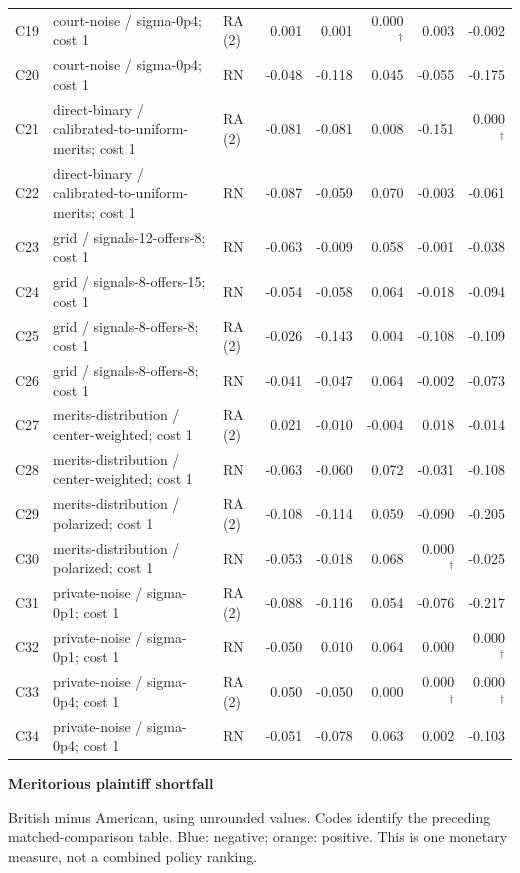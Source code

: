 \documentclass[10pt]{article}
\begin{document}
\begin{longtable}{@{}lp{3.0in}lrrrrr@{}}
C19 & court-noise / sigma-0p4; cost 1 & RA (2) & 0.001 & 0.001 & 0.000$^{\dagger}$ & 0.003 & -0.002\\
C20 & court-noise / sigma-0p4; cost 1 & RN & -0.048 & -0.118 & 0.045 & -0.055 & -0.175\\
C21 & direct-binary / calibrated-to-uniform-merits; cost 1 & RA (2) & -0.081 & -0.081 & 0.008 & -0.151 & 0.000$^{\dagger}$\\
C22 & direct-binary / calibrated-to-uniform-merits; cost 1 & RN & -0.087 & -0.059 & 0.070 & -0.003 & -0.061\\
C23 & grid / signals-12-offers-8; cost 1 & RN & -0.063 & -0.009 & 0.058 & -0.001 & -0.038\\
C24 & grid / signals-8-offers-15; cost 1 & RN & -0.054 & -0.058 & 0.064 & -0.018 & -0.094\\
C25 & grid / signals-8-offers-8; cost 1 & RA (2) & -0.026 & -0.143 & 0.004 & -0.108 & -0.109\\
C26 & grid / signals-8-offers-8; cost 1 & RN & -0.041 & -0.047 & 0.064 & -0.002 & -0.073\\
C27 & merits-distribution / center-weighted; cost 1 & RA (2) & 0.021 & -0.010 & -0.004 & 0.018 & -0.014\\
C28 & merits-distribution / center-weighted; cost 1 & RN & -0.063 & -0.060 & 0.072 & -0.031 & -0.108\\
C29 & merits-distribution / polarized; cost 1 & RA (2) & -0.108 & -0.114 & 0.059 & -0.090 & -0.205\\
C30 & merits-distribution / polarized; cost 1 & RN & -0.053 & -0.018 & 0.068 & 0.000$^{\dagger}$ & -0.025\\
C31 & private-noise / sigma-0p1; cost 1 & RA (2) & -0.088 & -0.116 & 0.054 & -0.076 & -0.217\\
C32 & private-noise / sigma-0p1; cost 1 & RN & -0.050 & 0.010 & 0.064 & 0.000 & 0.000$^{\dagger}$\\
C33 & private-noise / sigma-0p4; cost 1 & RA (2) & 0.050 & -0.050 & 0.000 & 0.000$^{\dagger}$ & 0.000$^{\dagger}$\\
C34 & private-noise / sigma-0p4; cost 1 & RN & -0.051 & -0.078 & 0.063 & 0.002 & -0.103\\
\end{longtable}\normalsize
\newpage
{\LARGE\bfseries Meritorious plaintiff shortfall}\par\smallskip
British minus American, using unrounded values. Codes identify the preceding matched-comparison table. Blue: negative; orange: positive. This is one monetary measure, not a combined policy ranking.\par\medskip
\end{document}
